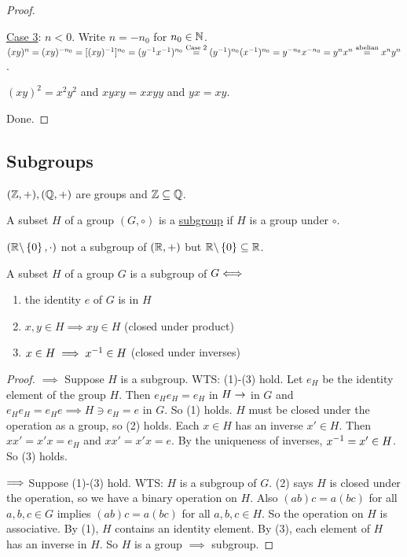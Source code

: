 \documentclass[]{article}
\begin{document}
\begin{proof}
\begin{enumerate}
				\ul{Case 3}: $n<0$. Write $n=-n_0$ for $n_0\in\mathbb{N}$. $(xy)^n = (xy)^{-n_0} = [(xy)^{-1}]^{n_0} = (y^{-1} x^{-1})^{n_0} \overset{\text{Case 2}}{=} (y^{-1})^{n_0}(x^{-1})^{n_0} = y^{-n_0} x^{-n_0} = y^nx^n \overset{\text{abelian}}{=} x^ny^n$.
			\begin{example}
				$(xy)^2 = x^2 y^2$ and $xyxy = xxyy$ and $yx = xy$.
			\end{example}
	\end{enumerate}
	Done.
\end{proof}

\subsection{Subgroups}

\begin{example}
	$(\mathbb{Z},+),(\mathbb{Q},+)$ are groups and $\mathbb{Z}\subseteq\mathbb{Q}$.
\end{example}
\begin{definition}
	A subset $H$ of a group $(G,\circ)$ is a \ul{subgroup} if $H$ is a group under $\circ$.
\end{definition}
\begin{example}
	$(\mathbb{R}\backslash\left\{ 0 \right\},\cdot)$ not a subgroup of $(\mathbb{R},+)$ but $\mathbb{R}\backslash\left\{ 0 \right\}\subseteq\mathbb{R}$.
\end{example}
\begin{proposition}
	A subset $H$ of a group $G$ is a subgroup of $G \Longleftrightarrow$
	\begin{enumerate}
		\item the identity $e$ of $G$ is in $H$
		\item $x,y\in H \implies xy\in H$ (closed under product)
		\item $x\in H \implies x^{-1}\in H$ (closed under inverses)
	\end{enumerate}
\end{proposition}
\begin{proof}
	\ul{$\implies$} Suppose $H$ is a subgroup.
	WTS: (1)-(3) hold.
	Let $e_H$ be the identity element of the group $H$. Then $e_He_H = e_H$ in $H \rightarrow$ in $G$ and $e_H e_H = e_H e \implies H\ni e_H = e$ in $G$. So (1) holds.
	$H$ must be closed under the operation as a group, so (2) holds.
	Each $x\in H$ has an inverse $x'\in H$. Then $xx' = x'x = e_H$ and $xx' = x'x = e$. By the uniqueness of inverses, $x^{-1} = x'\in H$. So (3) holds.

	\ul{$\Longrightarrow$} Suppose (1)-(3) hold. WTS: $H$ is a subgroup of $G$.
	(2) says $H$ is closed under the operation, so we have a binary operation on $H$.
	Also $(ab)c = a(bc)$ for all $a,b,c\in G$ implies $(ab)c = a(bc)$ for all $a,b,c\in H$. So the operation on $H$ is associative.
	By (1), $H$ contains an identity element. By (3), each element of $H$ has an inverse in $H$.
	So $H$ is a group $\implies$ subgroup.
\end{proof}
\end{document}
